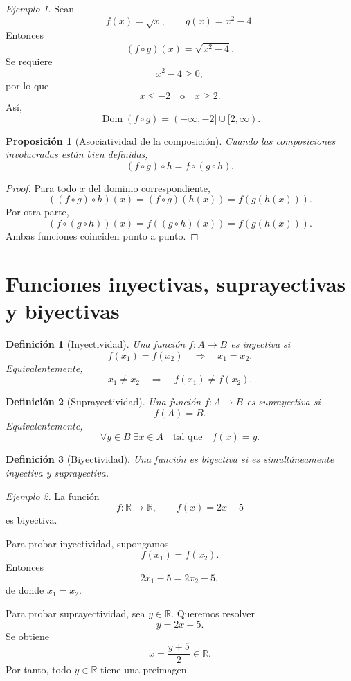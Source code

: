 \documentclass[12pt]{article}
\newtheorem{definicion}{Definición}[section]
\newtheorem{proposicion}{Proposición}[section]
\theoremstyle{remark}
\newtheorem{ejemplo}{Ejemplo}[section]
\newcommand{\R}{\mathbb{R}}
\newcommand{\Dom}{\operatorname{Dom}}
\begin{document}
\begin{ejemplo}
Sean
\[
f(x)=\sqrt{x},\qquad g(x)=x^2-4.
\]
Entonces
\[
(f\circ g)(x)=\sqrt{x^2-4}.
\]
Se requiere
\[
x^2-4\geq0,
\]
por lo que
\[
x\leq-2\quad\text{o}\quad x\geq2.
\]
Así,
\[
\Dom(f\circ g)=(-\infty,-2]\cup[2,\infty).
\]
\end{ejemplo}

\begin{proposicion}[Asociatividad de la composición]
Cuando las composiciones involucradas están bien definidas,
\[
(f\circ g)\circ h=f\circ(g\circ h).
\]
\end{proposicion}

\begin{proof}
Para todo $x$ del dominio correspondiente,
\[
((f\circ g)\circ h)(x)
=(f\circ g)(h(x))
=f(g(h(x))).
\]
Por otra parte,
\[
(f\circ(g\circ h))(x)
=f((g\circ h)(x))
=f(g(h(x))).
\]
Ambas funciones coinciden punto a punto.
\end{proof}

\section{Funciones inyectivas, suprayectivas y biyectivas}

\begin{definicion}[Inyectividad]
Una función $f:A\to B$ es inyectiva si
\[
f(x_1)=f(x_2)\quad\Longrightarrow\quad x_1=x_2.
\]
Equivalentemente,
\[
x_1\neq x_2\quad\Longrightarrow\quad f(x_1)\neq f(x_2).
\]
\end{definicion}

\begin{definicion}[Suprayectividad]
Una función $f:A\to B$ es suprayectiva si
\[
f(A)=B.
\]
Equivalentemente,
\[
\forall y\in B\;\exists x\in A
\quad\text{tal que}\quad
f(x)=y.
\]
\end{definicion}

\begin{definicion}[Biyectividad]
Una función es biyectiva si es simultáneamente inyectiva y suprayectiva.
\end{definicion}

\begin{ejemplo}
La función
\[
f:\R\to\R,\qquad f(x)=2x-5
\]
es biyectiva.

Para probar inyectividad, supongamos
\[
f(x_1)=f(x_2).
\]
Entonces
\[
2x_1-5=2x_2-5,
\]
de donde $x_1=x_2$.

Para probar suprayectividad, sea $y\in\R$. Queremos resolver
\[
y=2x-5.
\]
Se obtiene
\[
x=\frac{y+5}{2}\in\R.
\]
Por tanto, todo $y\in\R$ tiene una preimagen.
\end{ejemplo}
\end{document}

